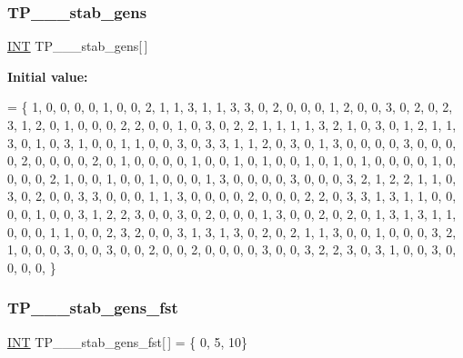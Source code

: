 \mbox{\label{data___t_p_8_c_a0c53cfc6392e75a77be70b541e685f4c}} 
\subsubsection{\texorpdfstring{T\+P\+\_\+\_\+\_\+stab\+\_\+gens}{TP\_4\_2\_stab\_gens}}
{\footnotesize\ttfamily \mbox{\hyperlink{galois_8h_a09fddde158a3a20bd2dcadb609de11dc}{I\+NT}} T\+P\+\_\+\_\+\_\+stab\+\_\+gens\mbox{[}$\,$\mbox{]}}

{\bfseries Initial value\+:}
\begin{DoxyCode}
= \{
1, 0, 0, 0, 0, 1, 0, 0, 2, 1, 1, 3, 1, 1, 3, 3, 0, 
2, 0, 0, 0, 1, 2, 0, 0, 3, 0, 2, 0, 2, 3, 1, 2, 0, 
1, 0, 0, 0, 2, 2, 0, 0, 1, 0, 3, 0, 2, 2, 1, 1, 1, 
1, 3, 2, 1, 0, 3, 0, 1, 2, 1, 1, 3, 0, 1, 0, 3, 1, 
0, 0, 1, 1, 0, 0, 3, 0, 3, 3, 1, 1, 2, 0, 3, 0, 1, 
3, 0, 0, 0, 0, 3, 0, 0, 0, 0, 2, 0, 0, 0, 0, 2, 0, 
1, 0, 0, 0, 0, 1, 0, 0, 1, 0, 1, 0, 0, 1, 0, 1, 0, 
1, 0, 0, 0, 0, 1, 0, 0, 0, 0, 2, 1, 0, 0, 1, 0, 0, 
1, 0, 0, 0, 1, 3, 0, 0, 0, 0, 3, 0, 0, 0, 3, 2, 1, 
2, 2, 1, 1, 0, 3, 0, 2, 0, 0, 3, 3, 0, 0, 0, 1, 1, 
3, 0, 0, 0, 0, 2, 0, 0, 0, 2, 2, 0, 3, 3, 1, 3, 1, 
1, 0, 0, 0, 0, 1, 0, 0, 3, 1, 2, 2, 3, 0, 0, 3, 0, 
2, 0, 0, 0, 1, 3, 0, 0, 2, 0, 2, 0, 1, 3, 1, 3, 1, 
1, 0, 0, 0, 1, 1, 0, 0, 2, 3, 2, 0, 0, 3, 1, 3, 1, 
3, 0, 2, 0, 2, 1, 1, 3, 0, 0, 1, 0, 0, 0, 3, 2, 1, 
0, 0, 0, 3, 0, 0, 3, 0, 0, 2, 0, 0, 2, 0, 0, 0, 0, 
3, 0, 0, 3, 2, 2, 3, 0, 3, 1, 0, 0, 3, 0, 0, 0, 0, 
\}
\end{DoxyCode}
\mbox{\label{data___t_p_8_c_ad686ff31036d92cbc0b76f0d746c8bfa}} 
\subsubsection{\texorpdfstring{T\+P\+\_\+\_\+\_\+stab\+\_\+gens\+\_\+fst}{TP\_4\_2\_stab\_gens\_fst}}
{\footnotesize\ttfamily \mbox{\hyperlink{galois_8h_a09fddde158a3a20bd2dcadb609de11dc}{I\+NT}} T\+P\+\_\+\_\+\_\+stab\+\_\+gens\+\_\+fst\mbox{[}$\,$\mbox{]} = \{ 0, 5, 10\}}

